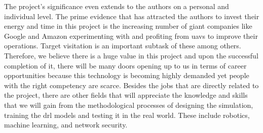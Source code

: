 \documentclass[../main.tex]{subfiles}
\begin{document}

The project's significance even extends to the authors
on a personal and individual level.
The prime evidence that has attracted the authors to invest
their energy and time in this project is
the increasing number of giant companies like Google and Amazon
experimenting with and profiting from \glspl{uav}
to improve their operations.
Target visitation is an important subtask of these among others.
Therefore, we believe there is a huge value
in this project and upon the successful completion of it,
there will be many doors opening up to us in terms of
career opportunities because 
this technology is becoming highly demanded yet 
people with the right competency
are scarce.
Besides the jobs that are directly related to the project,
there are other fields that will appreciate the knowledge
and skills that we will gain from the methodological processes 
of designing the simulation,
training the \gls{drl} models and testing it in the real world.
These include robotics, machine learning, and 
network security.
\end{document}
